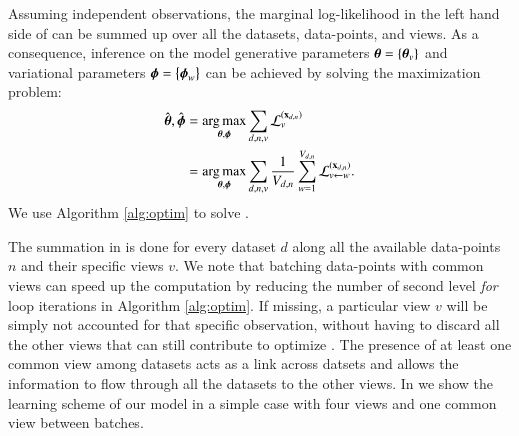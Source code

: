 Assuming independent observations, the marginal log-likelihood in the left hand side of  can be summed up over all the datasets, data-points, and views.
As a consequence, inference on the model generative parameters $\boldsymbol{\theta} = \left\{\boldsymbol{\theta}_v\right\}$ and variational parameters $\boldsymbol{\phi} = \left\{\boldsymbol{\phi}_w\right\}$ can be achieved by solving the maximization problem:
\begin{equation}\label{eq:argmax}
\begin{aligned}
\hat{\boldsymbol{\theta}}, \hat{\boldsymbol{\phi}} &= \underset{\boldsymbol{\theta}, \boldsymbol{\phi}}{\operatorname{arg\,max}} \sum_{d,n,v} \mathcal{L}_v^{(\mathbf{x}_{d,n})} \\
                           &= \underset{\boldsymbol{\theta}, \boldsymbol{\phi}}{\operatorname{arg\,max}} \sum_{d,n,v} \frac{1}{V_{d,n}} \sum_{w=1}^{V_{d,n}} \mathcal{L}_{v \leftarrow w}^{(\mathbf{x}_{d,n})}.
\end{aligned}
\end{equation}
We use Algorithm \ref{alg:optim} to solve .

The summation in  is done for every dataset $d$ along all the available data-points $n$ and their specific views $v$.
We note that batching data-points with common views can speed up the computation by reducing the number of second level \textit{for} loop iterations in Algorithm \ref{alg:optim}.
If missing, a particular view $v$ will be simply not accounted for that specific observation, without having to discard all the other views that can still contribute to optimize .
The presence of at least one common view among datasets acts as a link across datsets and allows the information to flow through all the datasets to the other views.
In  we show the learning scheme of our model in a simple case with four views and one common view between batches.



